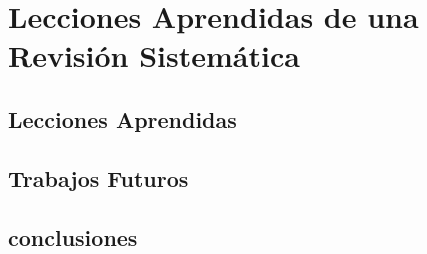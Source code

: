 \documentclass{report}
\begin{document}
    
\chapter{Lecciones Aprendidas de una Revisión Sistemática}
    
    \section{Lecciones Aprendidas}
    
    \section{Trabajos Futuros}
    
    \section{conclusiones}
\end{document}
